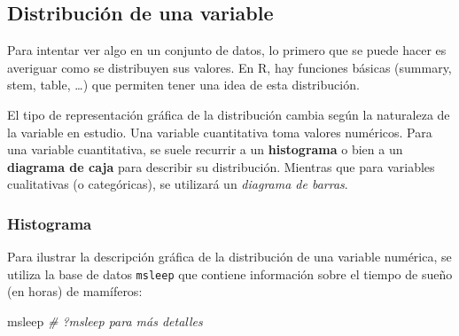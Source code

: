 \documentclass[
]{article}
\newenvironment{Shaded}{\begin{snugshade}}{\end{snugshade}}
\newcommand{\CommentTok}[1]{\textcolor[rgb]{0.56,0.35,0.01}{\textit{#1}}}
\newcommand{\NormalTok}[1]{#1}
\numberwithin{ejcnt}{section}
\begin{document}
\hypertarget{distribuciuxf3n-de-una-variable}{%
\subsection{Distribución de una variable}\label{distribuciuxf3n-de-una-variable}}

Para intentar ver algo en un conjunto de datos, lo primero que se puede hacer es averiguar como se distribuyen sus valores. En R, hay funciones básicas (summary, stem, table, \ldots) que permiten tener una idea de esta distribución.

El tipo de representación gráfica de la distribución cambia según la naturaleza de la variable en estudio. Una variable cuantitativa toma valores numéricos. Para una variable cuantitativa, se suele recurrir a un \textbf{histograma} o bien a un \textbf{diagrama de caja} para describir su distribución. Mientras que para variables cualitativas (o categóricas), se utilizará un \emph{diagrama de barras}.

\hypertarget{histograma}{%
\subsubsection{Histograma}\label{histograma}}

Para ilustrar la descripción gráfica de la distribución de una variable numérica, se utiliza la base de datos \texttt{msleep} que contiene información sobre el tiempo de sueño (en horas) de mamíferos:

\begin{Shaded}
\begin{Highlighting}[]
\NormalTok{msleep }\CommentTok{\# ?msleep para más detalles}
\end{Highlighting}
\end{Shaded}
\end{document}
